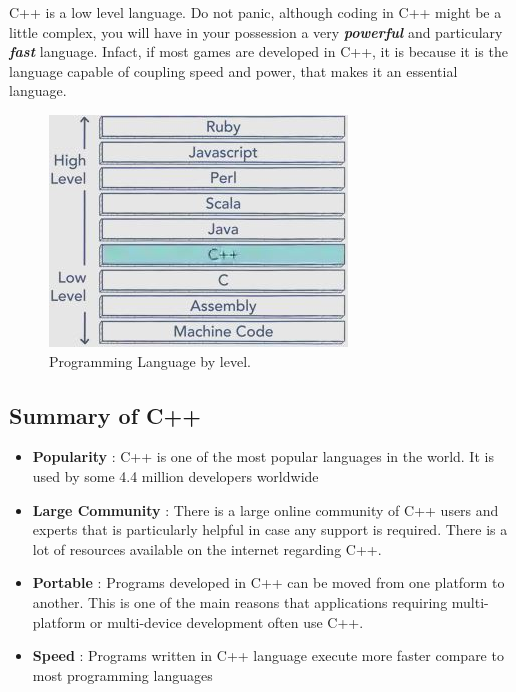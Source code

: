 \documentclass[11pt, a4paper]{article}
\begin{document}
C++ is a low level language. Do not panic, although coding in C++ might be a little complex, you will 
have in your possession a very \textbf{\textit{{powerful}}} and particulary \textbf{\textit{{fast}}} language.
Infact, if most games are developed in C++, it is because it is the language capable of coupling
speed and power, that makes it an essential language.

\begin{figure}[h!]
    \includegraphics[width = \linewidth]{diagrams/low vs high.JPG}
    \caption{Programming Language by level.}
    \label{fig:Programming Language by level}
    \end{figure}

\subsection{Summary of C++}
\begin{itemize}
    \item \textbf{Popularity} : C++ is one of the most popular
    languages in the world. It is used by some 4.4 million developers worldwide
    \item \textbf{Large Community} : There is a large online community
    of C++ users and experts that is particularly helpful in case any support is required.
    There is a lot of resources available on the internet regarding C++.
    \item \textbf{Portable} : Programs developed in C++ can be moved from one platform
    to another. This is one of the main reasons that applications requiring multi-platform
    or multi-device development often use C++.
    \item  \textbf{Speed} : Programs written in C++ language execute more faster compare
    to most programming languages\end{itemize}
\end{document}
